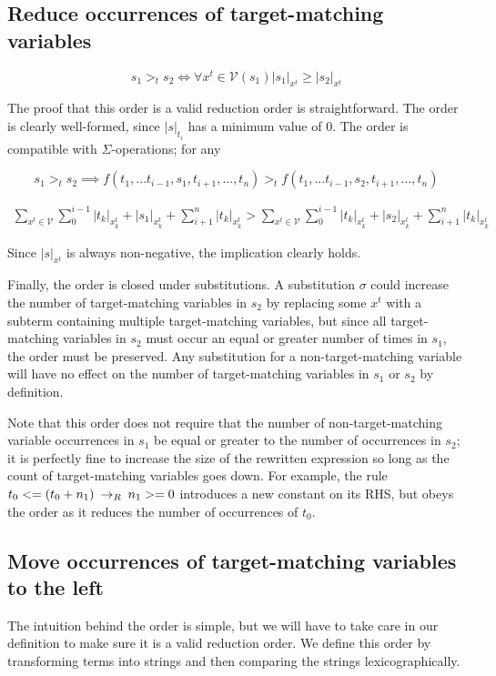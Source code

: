 \subsection{Reduce occurrences of target-matching variables}

\[ s_1 >_t s_2 \iff \forall x^t \in \mathcal{V}(s_1) |s_1|_{x^t} \geq |s_2|_{x^t}
\]

The proof that this order is a valid reduction order is straightforward. The order is clearly well-formed, since $|s|_{t_i}$ has a minimum value of 0. The order is compatible with $\Sigma$-operations; for any

\[ s_1 >_t s_2 \implies f(t_1,...t_{i-1},s_1,t_{i+1},...,t_n) >_t f(t_1,...t_{i-1},s_2,t_{i+1},...,t_n)
\]

\begin{align*}
\sum_{x^t \in \mathcal{V}} \sum_{0}^{i - 1} |t_k|_{x^t_k} + |s_1|_{x^t_k} + \sum_{i + 1}^{n} |t_k|_{x^t_k} >
\sum_{x^t \in \mathcal{V}} \sum_{0}^{i - 1} |t_k|_{x^t_k} + |s_2|_{x^t_k} + \sum_{i + 1}^{n} |t_k|_{x^t_k}
\end{align*}

Since $|s|_{x^t}$ is always non-negative, the implication clearly holds.

Finally, the order is closed under substitutions. A substitution $\sigma$ could increase the number of target-matching variables in $s_2$ by replacing some $x^t$ with a subterm containing multiple target-matching variables, but since all target-matching variables in $s_2$ must occur an equal or greater number of times in $s_1$, the order must be preserved. Any substitution for a non-target-matching variable will have no effect on the number of target-matching variables in $s_1$ or $s_2$ by definition. 

Note that this order does not require that the number of non-target-matching variable occurrences in $s_1$ be equal or greater to the number of occurrences in $s_2$; it is perfectly fine to increase the size of the rewritten expression so long as the count of target-matching variables goes down. For example, the rule $t_0 <= (t_0 + n_1) \:\rightarrow_{R}\: n_1 >= 0$ introduces a new constant on its RHS, but obeys the order as it reduces the number of occurrences of $t_0$.

\subsection{Move occurrences of target-matching variables to the left}

The intuition behind the order is simple, but we will have to take care in our definition to make sure it is a valid reduction order. We define this order by transforming terms into strings and then comparing the strings lexicographically.

